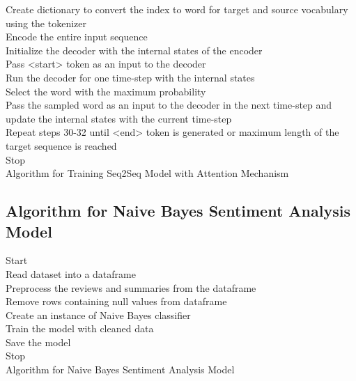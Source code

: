 \documentclass[11pt]{report}
\begin{document}
\begin{algorithm}[H]
    \Begin
    {
        Create dictionary to convert the index to word for target and source vocabulary using the tokenizer \\
        {
            Encode the entire input sequence \\
            Initialize the decoder with the internal states of the encoder \\
            Pass \textless start\textgreater \hspace{0.05cm} token as an input to the decoder \\
            Run the decoder for one time-step with the internal states \\
            Select the word with the maximum probability \\
            Pass the sampled word as an input to the decoder in the next time-step and update the internal states with the current time-step\\
            Repeat steps 30-32 until \textless end\textgreater \hspace{0.05cm} token is generated or maximum length of the target sequence is reached \\
        }
    }
    \End
Stop \\
\caption{Algorithm for Training Seq2Seq Model with Attention Mechanism}
\end{algorithm}
\vspace{0.5cm}

\subsection{Algorithm for Naive Bayes Sentiment Analysis Model}
\vspace{0.5cm}
\begin{algorithm}[H]
\SetAlgoLined
{}
Start \\
Read dataset into a dataframe \\
Preprocess the reviews and summaries from the dataframe \\
Remove rows containing null values from dataframe \\
Create an instance of Naive Bayes classifier \\
Train the model with cleaned data \\
Save the model\\
Stop \\
\caption{Algorithm for Naive Bayes Sentiment Analysis Model}
\end{algorithm}
\vspace{0.5cm}
\end{document}
